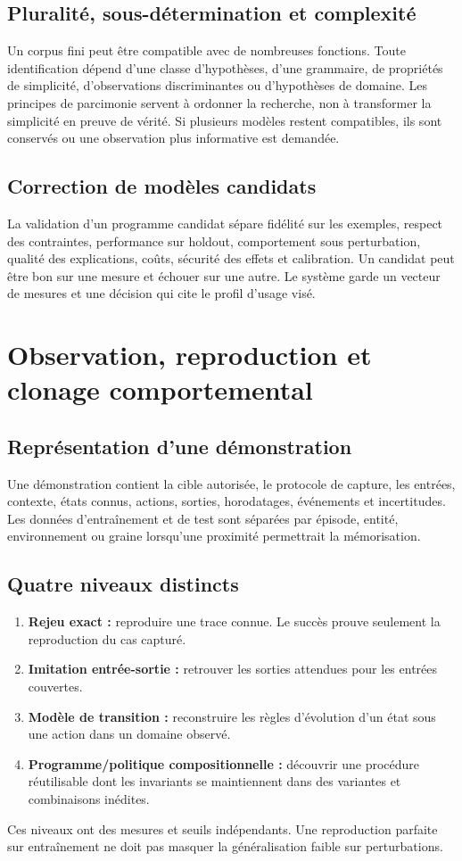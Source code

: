 \documentclass[11pt,a4paper]{article}
\newcommand{\Role}[1]{\textbf{#1}}
\begin{document}
\subsection{Pluralité, sous-détermination et complexité}
Un corpus fini peut être compatible avec de nombreuses fonctions. Toute identification dépend d'une classe d'hypothèses, d'une grammaire, de propriétés de simplicité, d'observations discriminantes ou d'hypothèses de domaine. Les principes de parcimonie servent à ordonner la recherche, non à transformer la simplicité en preuve de vérité. Si plusieurs modèles restent compatibles, ils sont conservés ou une observation plus informative est demandée.

\subsection{Correction de modèles candidats}
La validation d'un programme candidat sépare fidélité sur les exemples, respect des contraintes, performance sur holdout, comportement sous perturbation, qualité des explications, coûts, sécurité des effets et calibration. Un candidat peut être bon sur une mesure et échouer sur une autre. Le système garde un vecteur de mesures et une décision qui cite le profil d'usage visé.

\section{Observation, reproduction et clonage comportemental}
\subsection{Représentation d'une démonstration}
Une démonstration contient la cible autorisée, le protocole de capture, les entrées, contexte, états connus, actions, sorties, horodatages, événements et incertitudes. Les données d'entraînement et de test sont séparées par épisode, entité, environnement ou graine lorsqu'une proximité permettrait la mémorisation.

\subsection{Quatre niveaux distincts}
\begin{enumerate}
\item \Role{Rejeu exact :} reproduire une trace connue. Le succès prouve seulement la reproduction du cas capturé.
\item \Role{Imitation entrée-sortie :} retrouver les sorties attendues pour les entrées couvertes.
\item \Role{Modèle de transition :} reconstruire les règles d'évolution d'un état sous une action dans un domaine observé.
\item \Role{Programme/politique compositionnelle :} découvrir une procédure réutilisable dont les invariants se maintiennent dans des variantes et combinaisons inédites.
\end{enumerate}
Ces niveaux ont des mesures et seuils indépendants. Une reproduction parfaite sur entraînement ne doit pas masquer la généralisation faible sur perturbations.
\end{document}
